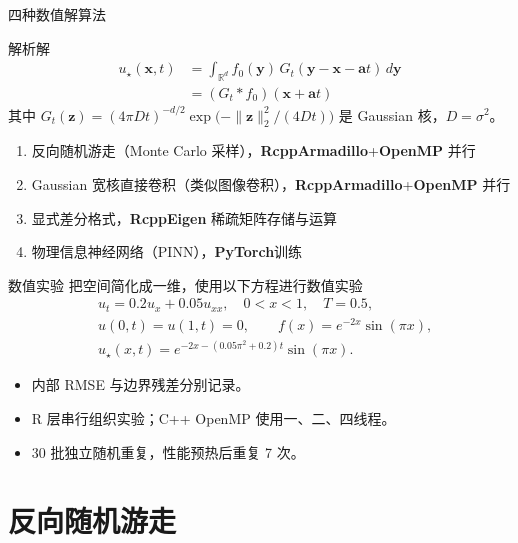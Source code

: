 \documentclass[UTF8,aspectratio=169,10pt]{ctexbeamer}
\begin{document}
\begin{frame}{四种数值解算法}
      \begin{exampleblock}{解析解}
            \[
            \begin{aligned}
                  u_{\star}(\boldsymbol{x},t)
                  &=\int_{\mathbb R^d}f_0(\boldsymbol{y})\,
                    G_t(\boldsymbol{y}-\boldsymbol{x}-\boldsymbol{a}t)\,d\boldsymbol{y}\\
                  &=(G_t \ast f_0)(\boldsymbol{x} + \boldsymbol{a}t)
            \end{aligned}
            \]
            {\small 其中 $G_t(\boldsymbol{z})=(4\pi Dt)^{-d/2}\exp\bigl(-\|\boldsymbol{z}\|_2^2/(4Dt)\bigr)$
            是 Gaussian 核，$D=\sigma^2$。}
      \end{exampleblock}
      \begin{enumerate}
            \item 反向随机游走（Monte Carlo 采样），\textbf{RcppArmadillo}+\textbf{OpenMP} 并行
            \item Gaussian 宽核直接卷积（类似图像卷积），\textbf{RcppArmadillo}+\textbf{OpenMP} 并行
            \item 显式差分格式，\textbf{RcppEigen} 稀疏矩阵存储与运算
            \item 物理信息神经网络（PINN），\textbf{PyTorch}训练
      \end{enumerate}
      
\end{frame}
\begin{frame}{数值实验}
把空间简化成一维，使用以下方程进行数值实验
\begin{align*}
& u_t = 0.2u_x + 0.05u_{xx}, \quad 0 < x < 1, \quad T = 0.5, \\
& u(0,t)=u(1,t)=0, \qquad f(x)=e^{-2x}\sin(\pi x), \\
& u_{\star}(x,t)=e^{-2x-(0.05\pi^2+0.2)t}\sin(\pi x).
\end{align*}

\begin{itemize}
\item 内部 RMSE 与边界残差分别记录。
\item R 层串行组织实验；C++ OpenMP 使用一、二、四线程。
\item 30 批独立随机重复，性能预热后重复 7 次。
\end{itemize}\end{frame}

\section{反向随机游走}
\end{document}
